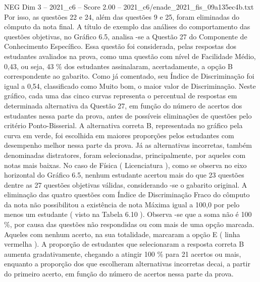 \begin{textsample}{NEG Dim 3 – 2021\_c6 – Score 2.00 – 2021\_c6/enade\_2021\_fis\_09a135ec4b.txt}
Por isso, as questões 22 e 24, além das questões 9 e 25, foram eliminadas do cômputo da nota final.
A título de exemplo das análises do comportamento das questões objetivas, no Gráfico 6.5, analisa -se a Questão 27 do Componente de Conhecimento Específico.
Essa questão foi considerada, pelas respostas dos estudantes avaliados na prova, como uma questão com nível de Facilidade Médio, 0,43, ou seja, 43 \% dos estudantes assinalaram, acertadamente, a opção B correspondente ao gabarito.
Como já comentado, seu Índice de Discriminação foi igual a 0,54, classificado como Muito bom, o maior valor de Discriminação.
Neste gráfico, cada uma das cinco curvas representa o percentual de respostas em determinada alternativa da Questão 27, em função do número de acertos dos estudantes nessa parte da prova, antes de possíveis eliminações de questões pelo critério Ponto-Bisserial.
A alternativa correta B, representada no gráfico pela curva em verde, foi escolhida em maiores proporções pelos estudantes com desempenho melhor nessa parte da prova.
Já as alternativas incorretas, também denominadas distratores, foram selecionadas, principalmente, por aqueles com notas mais baixas.
No caso de Física ( Licenciatura ), como se observa no eixo horizontal do Gráfico 6.5, nenhum estudante acertou mais do que 23 questões dentre as 27 questões objetivas válidas, considerando -se o gabarito original.
A eliminação das quatro questões com Índice de Discriminação Fraco do cômputo da nota não possibilitou a existência de nota Máxima igual a 100,0 por pelo menos um estudante ( visto na Tabela 6.10 ).
Observa -se que a soma não é 100 \%, por causa das questões não respondidas ou com mais de uma opção marcada.
Aqueles com nenhum acerto, na sua totalidade, marcaram a opção E ( linha vermelha ).
A proporção de estudantes que selecionaram a resposta correta B aumenta gradativamente, chegando a atingir 100 \% para 21 acertos ou mais, enquanto a proporção dos que escolheram alternativas incorretas decai, a partir do primeiro acerto, em função do número de acertos nessa parte da prova.

\end{textsample}
